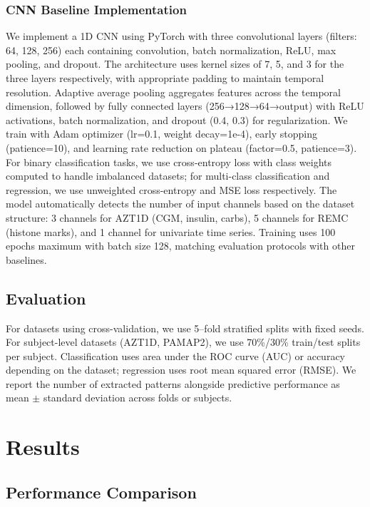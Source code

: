 \documentclass[11pt]{article}
\begin{document}
\subsubsection{CNN Baseline Implementation}
We implement a 1D CNN using PyTorch with three convolutional layers
(filters: 64, 128, 256) each containing convolution, batch normalization, ReLU,
max pooling, and dropout.
The architecture uses kernel sizes of 7, 5, and 3 for the three layers
respectively, with appropriate padding to maintain temporal resolution.
Adaptive average pooling aggregates features across the temporal dimension,
followed by fully connected layers (256→128→64→output) with ReLU activations,
batch normalization, and dropout (0.4, 0.3) for regularization.
We train with Adam optimizer (lr=0.1, weight decay=1e-4), early stopping
(patience=10), and learning rate reduction on plateau (factor=0.5, patience=3).
For binary classification tasks, we use cross-entropy loss with class weights
computed to handle imbalanced datasets; for multi-class classification and
regression, we use unweighted cross-entropy and MSE loss respectively.
The model automatically detects the number of input channels based on the
dataset structure: 3 channels for AZT1D (CGM, insulin, carbs), 5 channels for
REMC (histone marks), and 1 channel for univariate time series.
Training uses 100 epochs maximum with batch size 128, matching evaluation
protocols with other baselines.

\subsection{Evaluation}
For datasets using cross-validation, we use 5--fold stratified splits with fixed seeds.
For subject-level datasets (AZT1D, PAMAP2), we use 70\%/30\% train/test splits per subject.
Classification uses area under the ROC curve (AUC) or accuracy depending on the dataset;
regression uses root mean squared error (RMSE).
We report the number of extracted patterns alongside predictive performance as
mean $\pm$ standard deviation across folds or subjects. 

\section{Results}

\subsection{Performance Comparison}
\end{document}
